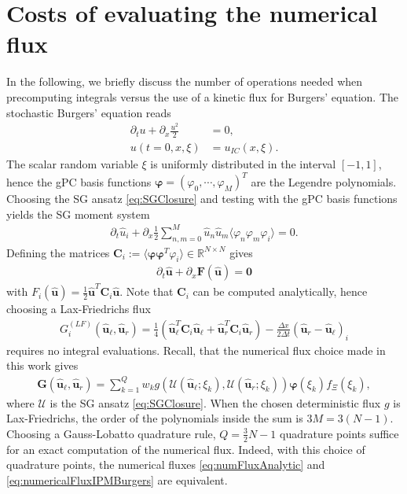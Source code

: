 \appendix
\section{Costs of evaluating the numerical flux}
\label{app:costNumFlux}
In the following, we briefly discuss the number of operations needed when precomputing integrals versus the use of a kinetic flux for Burgers' equation. The stochastic Burgers' equation reads
\begin{align*}
\partial_t u + \partial_x \frac{u^2}{2} &= 0,\\
u(t=0,x,\xi) &= u_{IC}(x,\xi).
\end{align*}
The scalar random variable $\xi$ is uniformly distributed in the interval $[-1,1]$, hence the gPC basis functions $\bm\varphi=(\varphi_0,\cdots,\varphi_M)^T$ are the Legendre polynomials. Choosing the SG ansatz \eqref{eq:SGClosure} and testing with the gPC basis functions yields the SG moment system
\begin{align*}
\partial_t \hat u_i + \partial_x \frac12\sum_{n,m = 0}^M \hat u_n \hat u_m \langle \varphi_n\varphi_m\varphi_i \rangle = 0.
\end{align*}
Defining the matrices $\bm C_i := \langle \bm\varphi\bm\varphi^T\varphi_i\rangle\in\mathbb{R}^{N\times N}$ gives
\begin{align*}
\partial_t \bm{\hat u} + \partial_x \bm F(\bm{\hat u}) = \bm 0
\end{align*}
with $F_i(\bm{\hat u}) = \frac12\bm{\hat u}^T\bm C_i\bm{\hat u}$. Note that $\bm{C}_i$ can be computed analytically, hence choosing a Lax-Friedrichs flux
\begin{align}\label{eq:numFluxAnalytic}
G_i^{(LF)}(\bm{\hat u}_{\ell},\bm{\hat u}_{r}) =\frac{1}{4}\left(\bm{\hat u}_{\ell}^T \bm{C}_i \bm{\hat u}_{\ell}+\bm{\hat u}_{r}^T \bm{C}_i \bm{\hat u}_{r}\right) - \frac{\Delta x}{2\Delta t}(\bm{\hat u}_{r}-\bm{\hat u}_{\ell})_i
\end{align}
requires no integral evaluations. Recall, that the numerical flux choice made in this work gives
\begin{align}\label{eq:numericalFluxIPMBurgers}
 \bm{G}(\bm{\hat u}_{\ell},\bm{\hat u}_{r}) = \sum_{k=1}^Q w_k g(\mathcal{U}(\bm{\hat u}_{\ell};\xi_k),\mathcal{U}(\bm{\hat u}_{r};\xi_k))\bm{\varphi}(\xi_k)f_{\Xi}(\xi_k),
\end{align}
where $\mathcal{U}$ is the SG ansatz \eqref{eq:SGClosure}. When the chosen deterministic flux $g$ is Lax-Friedrichs, the order of the polynomials inside the sum is $3M=3(N-1)$. Choosing a Gauss-Lobatto quadrature rule, $Q = \frac32 N -1$ quadrature points suffice for an exact computation of the numerical flux. Indeed, with this choice of quadrature points, the numerical fluxes \eqref{eq:numFluxAnalytic} and \eqref{eq:numericalFluxIPMBurgers} are equivalent. 
